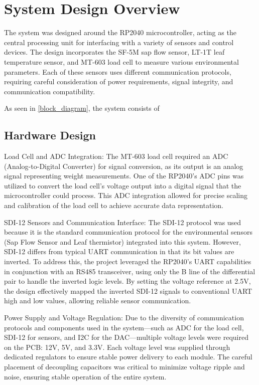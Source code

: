 
\section{System Design Overview}

The system was designed around the RP2040 microcontroller, acting as the central 
processing unit for interfacing with a variety of sensors and control devices. 
The design incorporates the SF-5M sap flow sensor, LT-1T leaf temperature sensor, 
and MT-603 load cell to measure various environmental parameters. Each of these 
sensors uses different communication protocols, requiring careful consideration of 
power requirements, signal integrity, and communication compatibility.

As seen in \cref{block_diagram}, the system consists of 

\subsection{Hardware Design}
Load Cell and ADC Integration: The MT-603 load cell required an ADC (Analog-to-Digital Converter) for signal conversion, as its output is an analog signal representing weight measurements. One of the RP2040's ADC pins was utilized to convert the load cell's voltage output into a digital signal that the microcontroller could process. This ADC integration allowed for precise scaling and calibration of the load cell to achieve accurate data representation.

SDI-12 Sensors and Communication Interface: The SDI-12 protocol was used because it is the standard communication protocol for the environmental sensors (Sap Flow Sensor and
Leaf thermistor) integrated into this system. However, SDI-12 differs from typical UART communication in that its bit values are inverted. To address this, the project leveraged the RP2040's UART capabilities in conjunction with an RS485 transceiver, using only the B line of the differential pair to handle the inverted logic levels. By setting the voltage reference at 2.5V, the design effectively mapped the inverted SDI-12 signals to conventional UART high and low values, allowing reliable sensor communication.

Power Supply and Voltage Regulation: Due to the diversity of communication protocols and components used in the system—such as ADC for the load cell, SDI-12 for sensors, and I2C for the DAC—multiple voltage levels were required on the PCB: 12V, 5V, and 3.3V. Each voltage level was supplied through dedicated regulators to ensure stable power delivery to each module. The careful placement of decoupling capacitors was critical to minimize voltage ripple and noise, ensuring stable operation of the entire system.

